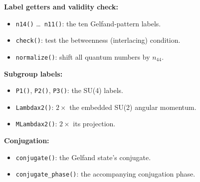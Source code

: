 \documentclass[aps,onecolumn,10pt,superscriptaddress,floatfix,nofootinbib]{revtex4}
\begin{document}
\textbf{Label getters and validity check:}
\begin{itemize}
    \item \verb|n14()| \dots\ \verb|n11()|: the ten Gelfand-pattern labels.
    \item \verb|check()|: test the betweenness (interlacing) condition.
    \item \verb|normalize()|: shift all quantum numbers by $n_{44}$.
\end{itemize}

\textbf{Subgroup labels:}
\begin{itemize}
    \item \verb|P1()|, \verb|P2()|, \verb|P3()|: the SU(4) labels.
    \item \verb|Lambdax2()|: $2\times$ the embedded SU(2) angular momentum.
    \item \verb|MLambdax2()|: $2\times$ its projection.
\end{itemize}

\textbf{Conjugation:}
\begin{itemize}
    \item \verb|conjugate()|: the Gelfand state's conjugate.
    \item \verb|conjugate_phase()|: the accompanying conjugation phase.
\end{itemize}
\end{document}
